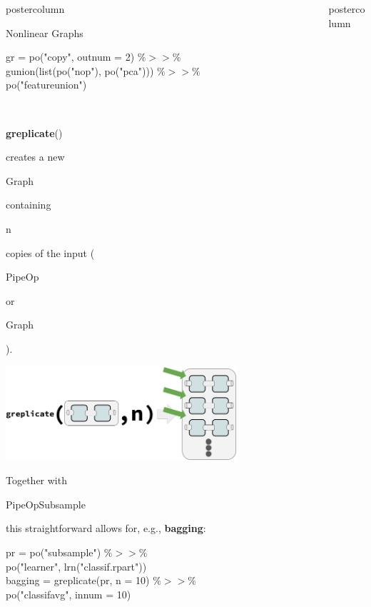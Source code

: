 \documentclass{beamer}
\newcommand{\codeinline}[1]{\begin{codeboxinline}#1\end{codeboxinline}}
\begin{document}
\begin{frame}[fragile]{}
\begin{columns}
\begin{column}{.245\textwidth}
\begin{beamercolorbox}[center]{postercolumn}
\begin{minipage}{.98\textwidth}
{\begin{myblock}{Nonlinear Graphs}
              \begin{codeboxexample}
						    {\footnotesize
                  gr = po("copy", outnum = 2) $\%>>\%$\\
                  \hspace*{1ex} gunion(list(po("nop"), po("pca"))) $\%>>\%$\\
                  \hspace*{1ex} po("featureunion")}
              \end{codeboxexample}
              \ \\
              \codeinline{\textbf{greplicate}()} creates a new \codeinline{Graph} containing \codeinline{n} copies of the input (\codeinline{PipeOp} or \codeinline{Graph}).
              \begin{center}
                \includegraphics[width=0.75\textwidth]{img/greplicate.png}
              \end{center}
              Together with \codeinline{PipeOpSubsample} this straightforward allows for, e.g., \textbf{bagging}:
              \begin{codeboxexample}
						    {\footnotesize
                  pr = po("subsample") $\%>>\%$\\
                  \hspace*{1ex} po("learner", lrn("classif.rpart"))\\
                  bagging = greplicate(pr, n = 10) $\%>>\%$\\
                  \hspace*{1ex} po("classifavg", innum = 10)}
					    \end{codeboxexample}
            \end{myblock}
						\vfill}
				\end{minipage}
			\end{beamercolorbox}
		\end{column}
    \begin{column}{.245\textwidth}
			\begin{beamercolorbox}[center]{postercolumn}

\end{beamercolorbox}
\end{column}
\end{columns}
\end{frame}
\end{document}
